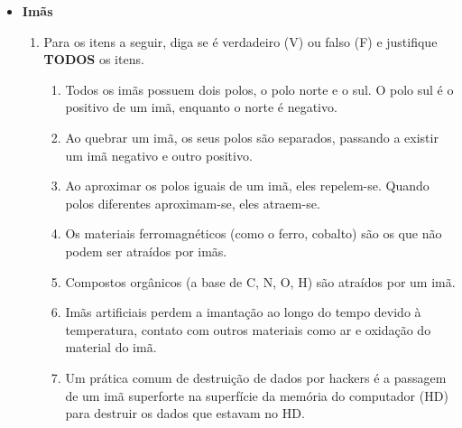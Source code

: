 \documentclass[12pt,letterpaper,fleqn]{article}
\begin{document}
    \begin{itemize}
        \item \textbf{Imãs}
        \begin{enumerate}
            \item Para os itens a seguir, diga se é verdadeiro (V) ou falso (F) e justifique \textbf{TODOS} os itens.
            \begin{enumerate}
                \item Todos os imãs possuem dois polos, o polo norte e o sul. O polo sul é o positivo de um imã, enquanto o norte é negativo.
                \item Ao quebrar um imã, os seus polos são separados, passando a existir um imã negativo e outro positivo.
                \item Ao aproximar os polos iguais de um imã, eles repelem-se. Quando polos diferentes aproximam-se, eles atraem-se.
                \item Os materiais ferromagnéticos (como o ferro, cobalto) são os que não podem ser atraídos por imãs.
                \item Compostos orgânicos (a base de C, N, O, H) são atraídos por um imã.
                \item Imãs artificiais perdem a imantação ao longo do tempo devido à temperatura, contato com outros materiais como ar e oxidação do material do imã.
                \item Um prática comum de destruição de dados por hackers é a passagem de um imã superforte na superfície da memória do computador (HD) para destruir os dados que estavam no HD.
            \end{enumerate}
            

\end{enumerate}
\end{itemize}
\end{document}
